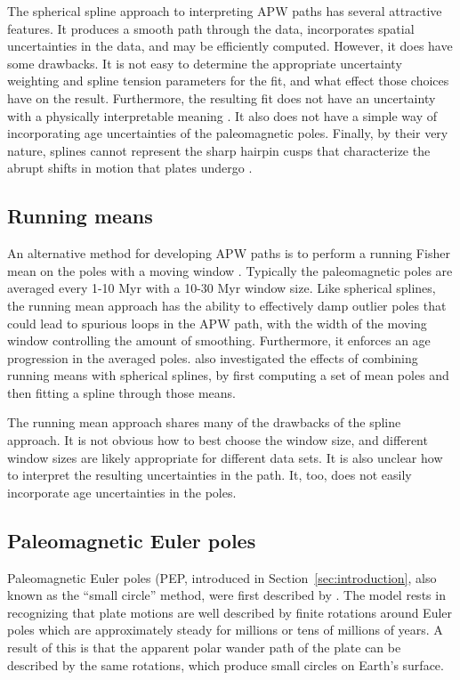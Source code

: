 \documentclass[preprint,12pt,authoryear]{elsarticle}
\begin{document}
The spherical spline approach to interpreting APW paths has several attractive features.
It produces a smooth path through the data, incorporates spatial uncertainties
in the data, and may be efficiently computed.
However, it does have some drawbacks.
It is not easy to determine the appropriate uncertainty weighting and spline
tension parameters for the fit, and what effect those choices have on the result.
Furthermore, the resulting fit does not have an uncertainty with a physically
interpretable meaning \citep{torsvik1996continental}.
It also does not have a simple way of incorporating age uncertainties of the paleomagnetic poles.
Finally, by their very nature, splines cannot represent the sharp hairpin cusps
that characterize the abrupt shifts in motion that plates undergo \citep{irving1972hairpins, gordon1984paleomagnetic}.

\subsection{Running means}
\label{sec:running_means}
An alternative method for developing APW paths is to perform a running Fisher
mean on the poles with a moving window \citep{van2001evidence, torsvik2008global}.
Typically the paleomagnetic poles are averaged every 1-10 Myr with a 10-30 Myr
window size. Like spherical splines, the running mean approach has the ability
to effectively damp outlier poles that could lead to spurious loops in the APW path, with the width
of the moving window controlling the amount of smoothing.
Furthermore, it enforces an age progression in the averaged poles.
\citet{torsvik2008global} also investigated the effects of combining running means
with spherical splines, by first computing a set of mean poles and then
fitting a spline through those means.

The running mean approach shares many of the drawbacks of the spline approach. 
It is not obvious how to best choose the window size, and different window sizes are
likely appropriate for different data sets. 
It is also unclear how to interpret the resulting uncertainties in the path.
It, too, does not easily incorporate age uncertainties in the poles.

\subsection{Paleomagnetic Euler poles}
Paleomagnetic Euler poles (PEP, introduced in Section~\ref{sec:introduction}, 
also known as the ``small circle'' method, were first described by \citet{gordon1984paleomagnetic}.
The model rests in recognizing that plate motions are well described by finite
rotations around Euler poles which are approximately steady for millions or 
tens of millions of years. A result of this is that the apparent polar
wander path of the plate can be described by the same rotations, which
produce small circles on Earth's surface.
\end{document}
